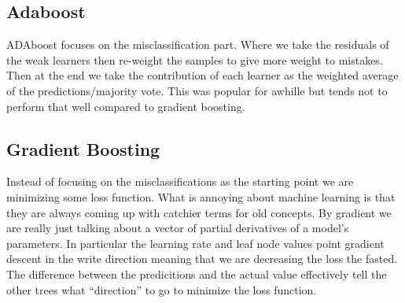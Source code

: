 \documentclass[
  letterpaper,
  DIV=11,
  numbers=noendperiod]{scrreprt}
\begin{document}
\subsection{Adaboost}\label{adaboost}

ADAboost focuses on the misclassification part. Where we take the
residuals of the weak learners then re-weight the samples to give more
weight to mistakes. Then at the end we take the contribution of each
learner as the weighted average of the predictions/majority vote. This
was popular for awhille but tends not to perform that well compared to
gradient boosting.

\subsection{Gradient Boosting}\label{gradient-boosting}

Instead of focusing on the misclassifications as the starting point we
are minimizing some loss function. What is annoying about machine
learning is that they are always coming up with catchier terms for old
concepts. By gradient we are really just talking about a vector of
partial derivatives of a model's parameters. In particular the learning
rate and leaf node values point gradient descent in the write direction
meaning that we are decreasing the loss the fasted. The difference
between the predicitions and the actual value effectively tell the other
trees what ``direction'' to go to minimize the loss function.
\end{document}
